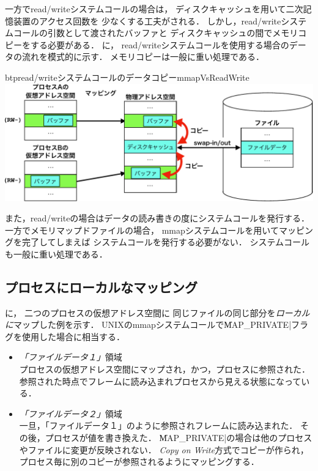 一方でread/writeシステムコールの場合は，
ディスクキャッシュを用いて二次記憶装置のアクセス回数を
少なくする工夫がされる．
しかし，read/writeシステムコールの引数として渡されたバッファと
ディスクキャッシュの間でメモリコピーをする必要がある．
に，
read/writeシステムコールを使用する場合のデータの流れを模式的に示す．
メモリコピーは一般に重い処理である．

\begin{myfig}{btp}{read/writeシステムコールのデータコピー}{mmapVsReadWrite}
  \includegraphics[scale=0.66]{Fig/mmapVsReadWrite-crop.pdf}
\end{myfig}

また，read/writeの場合はデータの読み書きの度にシステムコールを発行する．
一方でメモリマップドファイルの場合，
mmapシステムコールを用いてマッピングを完了してしまえば
システムコールを発行する必要がない．
システムコールも一般に重い処理である．

\subsection{プロセスにローカルなマッピング}
に，
二つのプロセスの仮想アドレス空間に
同じファイルの同じ部分を\emph{ローカルに}マップした例を示す．
UNIXのmmapシステムコールで\|MAP_PRIVATE|フラグを使用した場合に相当する．

\begin{itemize}
\item \emph{「ファイルデータ１」}領域 \\
プロセスの仮想アドレス空間にマップされ，かつ，プロセスに参照された．
参照された時点でフレームに読み込まれプロセスから見える状態になっている．
\item \emph{「ファイルデータ２」}領域 \\
一旦，「ファイルデータ１」のように参照されフレームに読み込まれた．
その後，プロセスが値を書き換えた．
\|MAP_PRIVATE|の場合は他のプロセスやファイルに変更が反映されない．
\emph{Copy on Write}方式でコピーが作られ，
プロセス毎に別のコピーが参照されるようにマッピングする．
\end{itemize}

